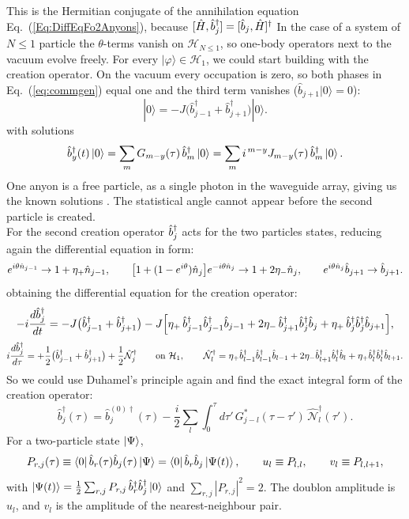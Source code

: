 \documentclass[a4paper, amsfonts, amssymb, amsmath, reprint, showkeys, nofootinbib ,twoside]{revtex4-2}
\begin{document}
This is the Hermitian conjugate of the annihilation equation  Eq.~(\ref{Eq:DiffEqFo2Anyons}), because $[\hat H,\hat b^\dagger_{j}]=[\hat b_{j},\hat H]^\dagger$
In the case of a system of $N\le 1$ particle the $\theta$-terms vanish on $\mathcal H_{N\le1}$, so one-body operators next to the vacuum evolve freely. For every $|\varphi\rangle\in\mathcal H_1$, we could start building with the creation operator. On the vacuum every occupation is zero, so both phases in Eq.~(\ref{eq:commgen}) equal one and the third term vanishes ($\hat{b}_{j+1}|0\rangle =0$):
\begin{equation}
[ \hat{H},\hat{b}^\dagger_j ] |0\rangle=-J\big(\hat{b}^\dagger_{j-1}+\hat{b}^\dagger_{j+1}\big) |0\rangle .
\end{equation}  
with solutions  
\begin{equation}
\hat b^\dagger_{y}(t)\ket0=\sum_mG_{m-y}(\tau)\,\hat b^\dagger_{m}\ket0=\sum_m i^{\,m-y}J_{m-y}(\tau)\,\hat b^\dagger_{m}\ket0 .
\end{equation}
One anyon is a free particle, as a single photon in the waveguide array, giving us the known solutions \cite{Jones1965Coupling, Bessen:2006gxf}. The statistical angle cannot appear before the second particle is created. \\ 
For the second creation operator $\hat b^\dagger_{j}$ acts for the two particles states, reducing again the differential equation in form: 
\begin{equation}
e^{i\theta\hat n_{j-1}}\to1+\eta_+\hat n_{j-1},\qquad \big[1+(1-e^{i\theta})\hat n_{j}\big]e^{-i\theta\hat n_{j}}\to1+2\eta_-\hat n_{j},\qquad e^{i\theta\hat n_{j}}\hat b_{j+1}\to\hat b_{j+1}.
\end{equation}
obtaining the differential equation for the creation operator: 
\begin{equation}\label{eq:r2}
-i\frac{d\hat b^\dagger_{j}}{dt}=-J\big(\hat b^\dagger_{j-1}+\hat b^\dagger_{j+1}\big)-J\Big[\eta_+\,\hat b^\dagger_{j-1}\hat b^\dagger_{j-1}\hat b_{j-1}+2\eta_-\,\hat b^\dagger_{j+1}\hat b^\dagger_{j}\hat b_{j}+\eta_+\,\hat b^\dagger_{j}\hat b^\dagger_{j}\hat b_{j+1}\Big],
\end{equation}  
\begin{equation}\label{eq:cubicdag}
i\frac{d\hat b^\dagger_{j}}{d\tau}=+\frac12\big(\hat b^\dagger_{j-1}+\hat b^\dagger_{j+1}\big)+\frac12\hat{\mathcal N}^\dagger_j\qquad\text{on }\mathcal H_{1},\qquad
\hat{\mathcal N}^\dagger_l=\eta_+\hat b^\dagger_{l-1}\hat b^\dagger_{l-1}\hat b_{l-1}+2\eta_-\hat b^\dagger_{l+1}\hat b^\dagger_{l}\hat b_{l}+\eta_+\hat b^\dagger_{l}\hat b^\dagger_{l}\hat b_{l+1}.
\end{equation}
So we could use Duhamel's principle again and find the exact integral form of  the creation operator: 
\begin{equation}\label{eq:bdagint}
\hat b^\dagger_j(\tau)=\hat b^{(0)\dagger}_j(\tau)-\frac i2\sum_l\int_0^\tau\!d\tau'\,G^*_{j-l}(\tau-\tau')\,\hat{\mathcal N}^\dagger_l(\tau').
\end{equation}
  For a two-particle state $\ket\Psi$,
\begin{equation}\label{eq:P}
P_{r,j}(\tau)\equiv\bra0\hat b_{r}(\tau)\hat b_{j}(\tau)\ket\Psi=\bra0\hat b_{r}\hat b_{j}\ket{\Psi(t)},\qquad u_l\equiv P_{l,l},\qquad v_l\equiv P_{l,l+1},
\end{equation}
with $\ket{\Psi(t)}=\frac12\sum_{r,j}P_{r,j}\,\hat b^\dagger_{r}\hat b^\dagger_{j}\ket0$ and $\sum_{r,j}|P_{r,j}|^2=2$. The doublon amplitude is $u_l$, and $v_l$ is the amplitude of the nearest-neighbour pair. \\ 
\end{document}
